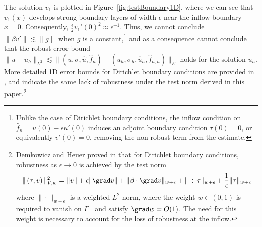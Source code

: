 The solution $v_1$ is plotted in Figure~\ref{fig:testBoundary1D}, where we can see that $v_1(x)$ develops strong boundary layers of width $\epsilon$ near the inflow boundary $x=0$. Consequently, $\frac{\epsilon}{2} v_1'(0)^2 \approx \epsilon^{-1}$. Thus, we cannot conclude $\|\beta v'\| \lesssim \|g\|$ when $g$ is a constant,\footnote{Unlike the case of Dirichlet boundary conditions, the inflow condition on $ \widehat{f}_n = u(0)-\epsilon u'(0)$ induces an adjoint boundary condition $\tau(0)=0$, or equivalently $v'(0) = 0$, removing the non-robust term from the estimate.} and as a consequence cannot conclude that the robust error bound $\|u-u_h\|_{L^2} \lesssim \|(u,\sigma,\widehat{u},\widehat{f}_n)-(u_h,\sigma_h,\widehat{u}_h,\widehat{f}_{n,h})\|_E$ holds for the solution $u_h$.  More detailed 1D error bounds for Dirichlet boundary conditions are provided in \cite{DPG3}, and indicate the same lack of robustness under the test norm derived in this paper.\footnote{Demkowicz and Heuer proved in \cite{DPGrobustness} that for Dirichlet boundary conditions, robustness as $\epsilon \rightarrow 0$ is achieved by the test norm
\[
\|\left(\tau, v\right)\|_{V,w}^2 = \|v\| + \epsilon \|\grad v\| + \|\beta \cdot \grad v\|_{w+\epsilon} + \| \div \tau\|_{w+\epsilon} + \frac{1}{\epsilon}\|\tau\|_{w+\epsilon}
\]
where $\|\cdot \|_{w+\epsilon}$ is a weighted $L^2$ norm, where the weight $w \in (0,1)$ is required to vanish on $\Gamma_-$ and satisfy $\grad w = O(1)$. The need for this weight is necessary to account for the loss of robustness at the inflow.} 

